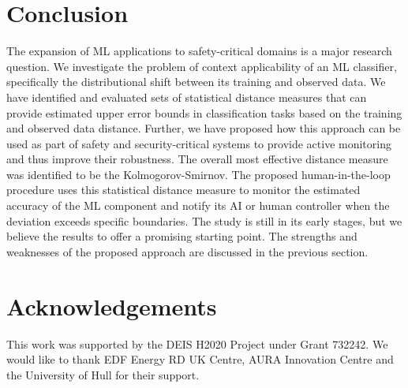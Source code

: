 \documentclass{article}
\begin{document}
\section{Conclusion} \label{section-conclusion}
The expansion of ML applications to safety-critical domains is a major research question. We investigate the problem of context applicability of an ML classifier, specifically the distributional shift between its training and observed data. We have identified and evaluated sets of statistical distance measures that can provide estimated upper error bounds in classification tasks based on the training and observed data distance. Further, we have proposed how this approach can be used as part of safety and security-critical systems to provide active monitoring and thus improve their robustness. The overall most effective distance measure was identified to be the Kolmogorov-Smirnov. The proposed human-in-the-loop procedure uses this statistical distance measure to monitor the estimated accuracy of the ML component and notify its AI or human controller when the deviation exceeds specific boundaries.  The study is still in its early stages, but we believe the results to offer a promising starting point. The strengths and weaknesses of the proposed approach are discussed in the previous section.
\nocite{*}
\section*{Acknowledgements} \label{section-acknowledgements}
This work was supported by the DEIS H2020 Project under Grant 732242. We would like to thank EDF Energy RD UK Centre, AURA Innovation Centre and the University of Hull for their support.

 
\end{document}
